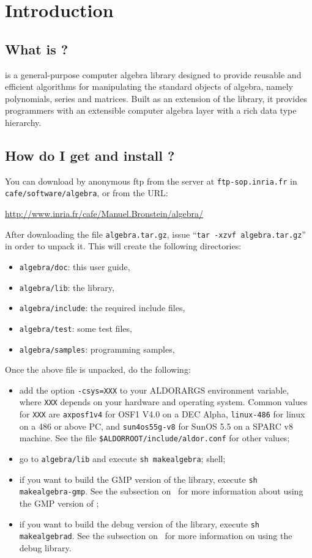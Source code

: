 \section{Introduction}

\subsection*{What is \stdmath?}
\stdmath{} is a general-purpose computer algebra library designed to
provide reusable and efficient algorithms for manipulating the standard
objects of algebra, namely polynomials, series and matrices.
Built as an extension of the \salli library, it provides \aldor
programmers with an extensible computer algebra layer with a rich
data type hierarchy.

\subsection*{How do I get and install \stdmath?}
You can download \stdmath by anonymous ftp from the \cafe server at
{\tt ftp-sop.inria.fr} in {\tt cafe/software/algebra},
or from the URL:\\
\vspace{-5mm}
\begin{center}
\url{http://www.inria.fr/cafe/Manuel.Bronstein/algebra/}
\end{center}
After downloading the file {\tt algebra.tar.gz}, issue
``{\tt tar -xzvf algebra.tar.gz}'' in order to unpack it.
This will create the following directories:
\begin{itemize}
\item{\tt algebra/doc}: this user guide,
\item{\tt algebra/lib}: the library,
\item{\tt algebra/include}: the required include files,
\item{\tt algebra/test}: some test files,
\item{\tt algebra/samples}: \stdmath programming samples,
\end{itemize}
Once the above file is unpacked, do the following:
\begin{itemize}
\item add the option {\tt -csys=XXX} to your ALDORARGS environment variable,
where {\tt XXX}
depends on your hardware and operating system. Common values for {\tt XXX}
are {\tt axposf1v4} for OSF1 V4.0 on a DEC Alpha, {\tt linux-486} for linux on
a 486 or above PC, and {\tt sun4os55g-v8} for SunOS 5.5 on a SPARC v8 machine.
See the file {\tt \$ALDORROOT/include/aldor.conf} for other values;
\item go to {\tt algebra/lib} and execute {\tt sh makealgebra};
shell;
\item if you want to build the GMP version of the library,
execute {\tt sh makealgebra-gmp}.
See the subsection on~
for more information about using the GMP version of \libalgebra;
\item if you want to build the debug version of the library,
execute {\tt sh makealgebrad}.
See the subsection on~
for more information on using the debug library.
\end{itemize}

